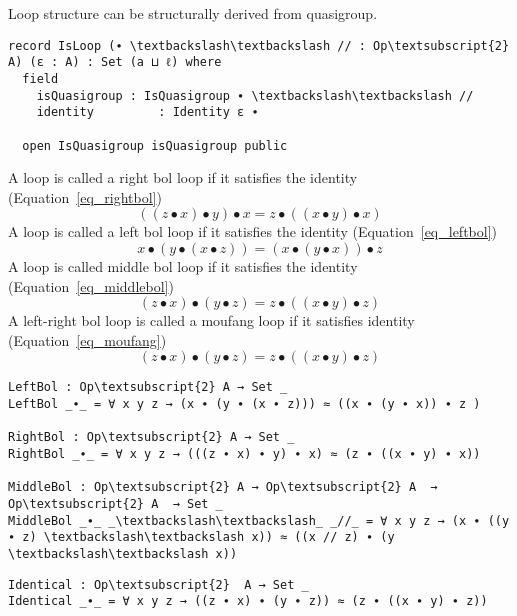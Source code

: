 Loop structure can be structurally derived from quasigroup.

\begin{Verbatim}[commandchars=\\\{\},samepage=true]
record IsLoop (∙ \textbackslash\textbackslash // : Op\textsubscript{2} A) (ε : A) : Set (a ⊔ ℓ) where
  field
    isQuasigroup : IsQuasigroup ∙ \textbackslash\textbackslash //
    identity         : Identity ε ∙

  open IsQuasigroup isQuasigroup public
\end{Verbatim}

\begin{comment}
  identity\textsuperscript{l} : LeftIdentity ε ∙
  identity\textsuperscript{l} = proj\textsubscript{1} identity

  identity\textsuperscript{r} : RightIdentity ε ∙
  identity\textsuperscript{r} = proj\textsubscript{2} identity
\end{comment}

A loop is called a right bol loop if it satisfies the identity  (Equation~\ref{eq_rightbol})
\begin{equation}\label{eq_rightbol}
 ((z ∙ x) ∙ y) ∙ x = z ∙ ((x ∙ y) ∙ x)
\end{equation}
A loop is called a left bol loop if it satisfies the identity (Equation~\ref{eq_leftbol})
\begin{equation}\label{eq_leftbol}
 x ∙ (y ∙ (x ∙ z)) = (x ∙ (y ∙ x)) ∙ z
\end{equation}
A loop is called middle bol loop if it satisfies the identity (Equation~\ref{eq_middlebol}) 
\begin{equation}\label{eq_middlebol}
(z ∙ x) ∙ (y ∙ z) = z ∙ ((x ∙ y) ∙ z)
\end{equation}
A left-right bol loop is called a moufang loop if it satisfies identity (Equation~\ref{eq_moufang})
\begin{equation}\label{eq_moufang}
(z ∙ x) ∙ (y ∙ z) = z ∙ ((x ∙ y) ∙ z)
\end{equation} 

\begin{Verbatim}[commandchars=\\\{\},samepage=true]
LeftBol : Op\textsubscript{2} A → Set _
LeftBol _∙_ = ∀ x y z → (x ∙ (y ∙ (x ∙ z))) ≈ ((x ∙ (y ∙ x)) ∙ z )

RightBol : Op\textsubscript{2} A → Set _
RightBol _∙_ = ∀ x y z → (((z ∙ x) ∙ y) ∙ x) ≈ (z ∙ ((x ∙ y) ∙ x))

MiddleBol : Op\textsubscript{2} A → Op\textsubscript{2} A  → Op\textsubscript{2} A  → Set _
MiddleBol _∙_ _\textbackslash\textbackslash_ _//_ = ∀ x y z → (x ∙ ((y ∙ z) \textbackslash\textbackslash x)) ≈ ((x // z) ∙ (y \textbackslash\textbackslash x))
\end{Verbatim}
\begin{Verbatim}[commandchars=\\\{\},samepage=true]
Identical : Op\textsubscript{2}  A → Set _
Identical _∙_ = ∀ x y z → ((z ∙ x) ∙ (y ∙ z)) ≈ (z ∙ ((x ∙ y) ∙ z))
\end{Verbatim}

